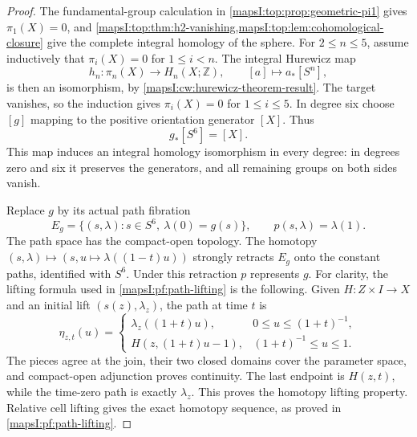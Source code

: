 \documentclass[11pt]{article}
\begin{document}
\begin{proof}
The fundamental-group calculation in
\cref{mapsI:top:prop:geometric-pi1} gives \(\pi_1(X)=0\), and
\cref{mapsI:top:thm:h2-vanishing,mapsI:top:lem:cohomological-closure}
give the complete integral homology of the sphere.  For \(2\le n\le5\),
assume inductively that \(\pi_i(X)=0\) for \(1\le i<n\).  The integral
Hurewicz map
\[
 h_n:\pi_n(X)\longrightarrow H_n(X;\mathbb Z),
 \qquad [a]\longmapsto a_*[S^n],
\]
is then an isomorphism, by \cref{mapsI:cw:hurewicz-theorem-result}.
The target vanishes, so the induction gives \(\pi_i(X)=0\) for
\(1\le i\le5\).  In degree six choose \([g]\) mapping to the positive
orientation generator \([X]\).  Thus
\begin{equation}
 g_*[S^6]=[X].
 \label{mapsI:course:degree-one}
\end{equation}
This map induces an integral homology isomorphism in every degree:
in degrees zero and six it preserves the generators, and all remaining
groups on both sides vanish.

Replace \(g\) by its actual path fibration
\[
 E_g=\{(s,\lambda):s\in S^6,\ \lambda(0)=g(s)\},
 \qquad p(s,\lambda)=\lambda(1).
\]
The path space has the compact-open topology.  The homotopy
\((s,\lambda)\mapsto(s,u\mapsto\lambda((1-t)u))\) strongly retracts
\(E_g\) onto the constant paths, identified with \(S^6\).
Under this retraction \(p\) represents \(g\).
For clarity, the lifting formula used in \cref{mapsI:pf:path-lifting}
is the following.  Given \(H:Z\times I\to X\) and an initial lift
\((s(z),\lambda_z)\), the path at time \(t\) is
\[
 \eta_{z,t}(u)=
 \begin{cases}
 \lambda_z((1+t)u),&0\le u\le (1+t)^{-1},\\
 H(z,(1+t)u-1),&(1+t)^{-1}\le u\le1.
 \end{cases}
\]
The pieces agree at the join, their two closed domains cover the parameter
space, and compact-open adjunction proves continuity.  The last endpoint
is \(H(z,t)\), while the time-zero path is exactly \(\lambda_z\).
This proves the homotopy lifting property.  Relative cell lifting gives
the exact homotopy sequence, as proved in
\cref{mapsI:pf:path-lifting}.


\end{proof}
\end{document}
